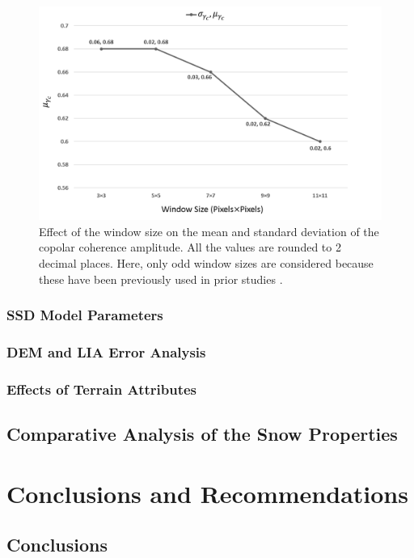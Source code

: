 \documentclass[review]{elsarticle}
\numberwithin{equation}{section}
\numberwithin{figure}{section}
\numberwithin{table}{section}
\begin{document}
\begin{figure}[htb]
    \centering
    \includegraphics[width=\textwidth]{Figures/Results/Coh_FSD.png}
    \caption{Effect of the window size on the mean and standard deviation of the copolar coherence amplitude. All the
values are rounded to 2 decimal places. Here, only odd window sizes are considered because these have been previously used in prior studies \citep{Leinss2018, Leinss2014, Kumar2011}.}
    \label{fig:fsd_coh}
\end{figure}

\subsubsection{SSD Model Parameters}
\subsubsection{DEM and LIA Error Analysis}
\label{sssec:error}
\subsubsection{Effects of Terrain Attributes}
\label{sssec:terrain}
\subsection{Comparative Analysis of the Snow Properties}
\label{ssec:snow}

\section{Conclusions and Recommendations}
\label{sec:conc}
\subsection{Conclusions}
\end{document}
